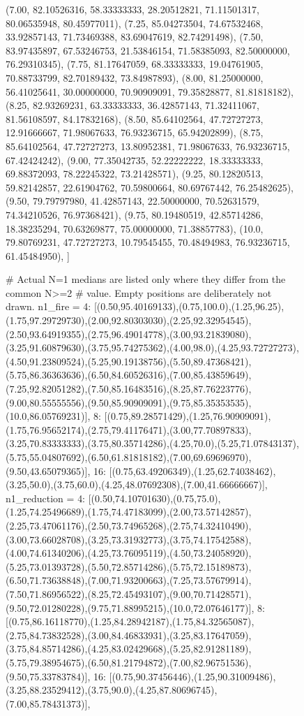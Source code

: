 \begin{figure}[H]
\begin{CacheMeCode}
    (7.00, 82.10526316, 58.33333333, 28.20512821, 71.11501317, 80.06535948, 80.45977011),
    (7.25, 85.04273504, 74.67532468, 33.92857143, 71.73469388, 83.69047619, 82.74291498),
    (7.50, 83.97435897, 67.53246753, 21.53846154, 71.58385093, 82.50000000, 76.29310345),
    (7.75, 81.17647059, 68.33333333, 19.04761905, 70.88733799, 82.70189432, 73.84987893),
    (8.00, 81.25000000, 56.41025641, 30.00000000, 70.90909091, 79.35828877, 81.81818182),
    (8.25, 82.93269231, 63.33333333, 36.42857143, 71.32411067, 81.56108597, 84.17832168),
    (8.50, 85.64102564, 47.72727273, 12.91666667, 71.98067633, 76.93236715, 65.94202899),
    (8.75, 85.64102564, 47.72727273, 13.80952381, 71.98067633, 76.93236715, 67.42424242),
    (9.00, 77.35042735, 52.22222222, 18.33333333, 69.88372093, 78.22245322, 73.21428571),
    (9.25, 80.12820513, 59.82142857, 22.61904762, 70.59800664, 80.69767442, 76.25482625),
    (9.50, 79.79797980, 41.42857143, 22.50000000, 70.52631579, 74.34210526, 76.97368421),
    (9.75, 80.19480519, 42.85714286, 18.38235294, 70.63269877, 75.00000000, 71.38857783),
    (10.0, 79.80769231, 47.72727273, 10.79545455, 70.48494983, 76.93236715, 61.45484950),
]

# Actual N=1 medians are listed only where they differ from the common N>=2
# value.  Empty positions are deliberately not drawn.
n1_fire = {
    4: [(0.50,95.40169133),(0.75,100.0),(1.25,96.25),(1.75,97.29729730),(2.00,92.80303030),(2.25,92.32954545),(2.50,93.64919355),(2.75,96.49014778),(3.00,93.21839080),(3.25,91.60879630),(3.75,95.74275362),(4.00,98.0),(4.25,93.72727273),(4.50,91.23809524),(5.25,90.19138756),(5.50,89.47368421),(5.75,86.36363636),(6.50,84.60526316),(7.00,85.43859649),(7.25,92.82051282),(7.50,85.16483516),(8.25,87.76223776),(9.00,80.55555556),(9.50,85.90909091),(9.75,85.35353535),(10.0,86.05769231)],
    8: [(0.75,89.28571429),(1.25,76.90909091),(1.75,76.95652174),(2.75,79.41176471),(3.00,77.70897833),(3.25,70.83333333),(3.75,80.35714286),(4.25,70.0),(5.25,71.07843137),(5.75,55.04807692),(6.50,61.81818182),(7.00,69.69696970),(9.50,43.65079365)],
    16: [(0.75,63.49206349),(1.25,62.74038462),(3.25,50.0),(3.75,60.0),(4.25,48.07692308),(7.00,41.66666667)],
}
n1_reduction = {
    4: [(0.50,74.10701630),(0.75,75.0),(1.25,74.25496689),(1.75,74.47183099),(2.00,73.57142857),(2.25,73.47061176),(2.50,73.74965268),(2.75,74.32410490),(3.00,73.66028708),(3.25,73.31932773),(3.75,74.17542588),(4.00,74.61340206),(4.25,73.76095119),(4.50,73.24058920),(5.25,73.01393728),(5.50,72.85714286),(5.75,72.15189873),(6.50,71.73638848),(7.00,71.93200663),(7.25,73.57679914),(7.50,71.86956522),(8.25,72.45493107),(9.00,70.71428571),(9.50,72.01280228),(9.75,71.88995215),(10.0,72.07646177)],
    8: [(0.75,86.16118770),(1.25,84.28942187),(1.75,84.32565087),(2.75,84.73832528),(3.00,84.46833931),(3.25,83.17647059),(3.75,84.85714286),(4.25,83.02429668),(5.25,82.91281189),(5.75,79.38954675),(6.50,81.21794872),(7.00,82.96751536),(9.50,75.33783784)],
    16: [(0.75,90.37456446),(1.25,90.31009486),(3.25,88.23529412),(3.75,90.0),(4.25,87.80696745),(7.00,85.78431373)],
}


\end{CacheMeCode}
\end{figure}
